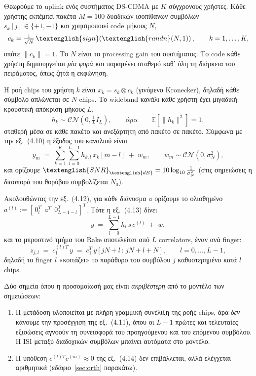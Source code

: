\documentclass[11pt,a4paper]{article}
\newcommand{\en}[1]{\textenglish{#1}}
\newcommand{\SNR}{\en{SNR}}
\newcommand{\Rake}{\en{Rake}}
\begin{document}
Θεωρούμε το \en{uplink} ενός συστήματος \en{DS-CDMA} με $K$ σύγχρονους χρήστες. Κάθε
χρήστης εκπέμπει πακέτα $M=100$ δυαδικών ισοπίθανων συμβόλων $s_k[j] \in \{+1,-1\}$ και
χρησιμοποιεί \en{code} μήκους $N$,
\[
  c_k = \tfrac{1}{\sqrt{N}}\,\en{sign}\!\left(\en{randn}(N,1)\right),
  \qquad k = 1,\dots,K ,
\]
οπότε $\|c_k\|=1$. Το $N$ είναι το \en{processing gain} του συστήματος. Το \en{code} κάθε
χρήστη δημιουργείται \emph{μία φορά} και παραμένει σταθερό καθ' όλη τη διάρκεια του
πειράματος, όπως ζητά η εκφώνηση.

Η ροή \en{chips} του χρήστη $k$ είναι $x_k = s_k \otimes c_k$ (γινόμενο \en{Kronecker}),
δηλαδή κάθε σύμβολο απλώνεται σε $N$ \en{chips}. Το \en{wideband} κανάλι κάθε χρήστη έχει
μιγαδική κρουστική απόκριση μήκους $L$,
\[
  h_k \sim \mathcal{CN}\!\left(0, \tfrac{1}{L} I_L\right),
  \qquad \text{άρα}\qquad \mathbb{E}\!\left[\|h_k\|^2\right] = 1 ,
\]
σταθερή μέσα σε κάθε πακέτο και ανεξάρτητη από πακέτο σε πακέτο. Σύμφωνα με την εξ.~(4.10)
η έξοδος του καναλιού είναι
\[
  y_m \;=\; \sum_{k=1}^{K}\sum_{l=0}^{L-1} h_{k,l}\, x_k[m-l] \;+\; w_m ,
  \qquad w_m \sim \mathcal{CN}(0,\sigma_N^2),
\]
και ορίζουμε $\SNR_{\en{dB}} = 10\log_{10}\frac{1}{\sigma_N^2}$ (στις σημειώσεις η διασπορά
του θορύβου συμβολίζεται $N_0$).

Ακολουθώντας την εξ.~(4.12), για κάθε διάνυσμα $a$ ορίζουμε το ολισθημένο
$a^{(l)} := [\,0_l^T \ \ a^T \ \ 0_{L-1-l}^T\,]^T$. Τότε η εξ.~(4.13) δίνει
\[
  y \;=\; \sum_{l=0}^{L-1} h_l\, s\, c^{(l)} \;+\; w ,
\]
και το μπροστινό τμήμα του \Rake{} αποτελείται από $L$ \en{correlators}, έναν ανά
\en{finger}:
\[
  z_{j,l} \;=\; c_1^{(l)T}\, y \;=\; c_1^{T}\, y\!\left[jN+l \,:\, jN+l+N\right],
  \qquad l = 0,\dots,L-1 ,
\]
δηλαδή το \en{finger} $l$ «κοιτάζει» το παράθυρο του συμβόλου $j$ καθυστερημένο κατά $l$
\en{chips}.

Δύο σημεία όπου η προσομοίωσή μας είναι \emph{ακριβέστερη} από το μοντέλο των σημειώσεων:

\begin{enumerate}[leftmargin=2em]
  \item Η μετάδοση υλοποιείται με πλήρη γραμμική συνέλιξη της ροής \en{chips}, άρα
        \emph{δεν} κάνουμε την προσέγγιση της εξ.~(4.11), όπου οι $L-1$ πρώτες και
        τελευταίες εξισώσεις αγνοούν τη συνεισφορά του προηγούμενου και του επόμενου
        συμβόλου. Η \en{ISI} μεταξύ διαδοχικών συμβόλων μπαίνει αυτόματα στο μοντέλο.
  \item Η υπόθεση $c^{(l)T}c^{(m)} \approx 0$ της εξ.~(4.14) δεν επιβάλλεται, αλλά
        ελέγχεται αριθμητικά (εδάφιο~\ref{sec:orth} παρακάτω).
\end{enumerate}
\end{document}
